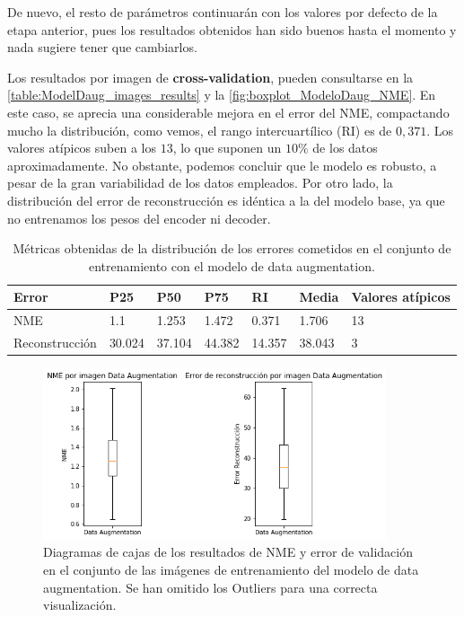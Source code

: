         \medskip

        \noindent De nuevo, el resto de parámetros continuarán con los valores por defecto de la etapa anterior, pues los resultados obtenidos han sido buenos hasta el momento y nada sugiere tener que cambiarlos.

        \medskip

        \noindent Los resultados por imagen de \textbf{cross-validation}, pueden consultarse en la \autoref{table:ModelDaug_images_results} y la \autoref{fig:boxplot_ModeloDaug_NME}. En este caso, se aprecia una considerable mejora en el error del NME, compactando mucho la distribución, como vemos, el rango intercuartílico (RI) es de $0,371$. Los valores atípicos suben a los $13$, lo que suponen un $10\%$ de los datos aproximadamente. No obstante, podemos concluir que le modelo es robusto, a pesar de la gran variabilidad de los datos empleados. Por otro lado, la distribución del error de reconstrucción es idéntica a la del modelo base, ya que no entrenamos los pesos del encoder ni decoder.

        \begin{table}[!ht]
            \centering
            \caption{Métricas obtenidas de la distribución de los errores cometidos en el conjunto de entrenamiento con el modelo de data augmentation.}
            \begin{tabular}{|l|l|l|l|l|l|l|}
            \hline
            \cellcolor{gray!25}\textbf{Error} & \cellcolor{gray!25}\textbf{P25} & \cellcolor{gray!25}\textbf{P50} & \cellcolor{gray!25}\textbf{P75} & \cellcolor{gray!25}\textbf{RI} & \cellcolor{gray!25}\textbf{Media} & \cellcolor{gray!25}\textbf{Valores atípicos}\\ \hline
                NME & 1.1 & 1.253 & 1.472 & 0.371 & 1.706 & 13 \\ \hline
                Reconstrucción & 30.024 & 37.104 & 44.382 & 14.357 & 38.043 & 3 \\ \hline
            \end{tabular}
            \label{table:ModelDaug_images_results}
        \end{table}

        \begin{figure}[H]
            \centering
            \includegraphics[width=0.9\textwidth]{img/boxplot_daug.png}
            \caption{Diagramas de cajas de los resultados de NME y error de validación en el conjunto de las imágenes de entrenamiento del modelo de data augmentation. Se han omitido los Outliers para una correcta visualización.}
            \label{fig:boxplot_ModeloDaug_NME}
        \end{figure}

